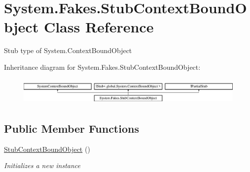 \hypertarget{class_system_1_1_fakes_1_1_stub_context_bound_object}{\section{System.\-Fakes.\-Stub\-Context\-Bound\-Object Class Reference}
\label{class_system_1_1_fakes_1_1_stub_context_bound_object}
}


Stub type of System.\-Context\-Bound\-Object 


Inheritance diagram for System.\-Fakes.\-Stub\-Context\-Bound\-Object\-:\begin{figure}[H]
\begin{center}
\leavevmode
\includegraphics[height=1.387856cm]{class_system_1_1_fakes_1_1_stub_context_bound_object}
\end{center}
\end{figure}
\subsection*{Public Member Functions}
\begin{DoxyCompactItemize}
\item 
\hyperlink{class_system_1_1_fakes_1_1_stub_context_bound_object_a04eb4ccaee56b247f6ad3544a06fe2fc}{Stub\-Context\-Bound\-Object} ()
\begin{DoxyCompactList}\small\item\em Initializes a new instance\end{DoxyCompactList}\end{DoxyCompactItemize}
